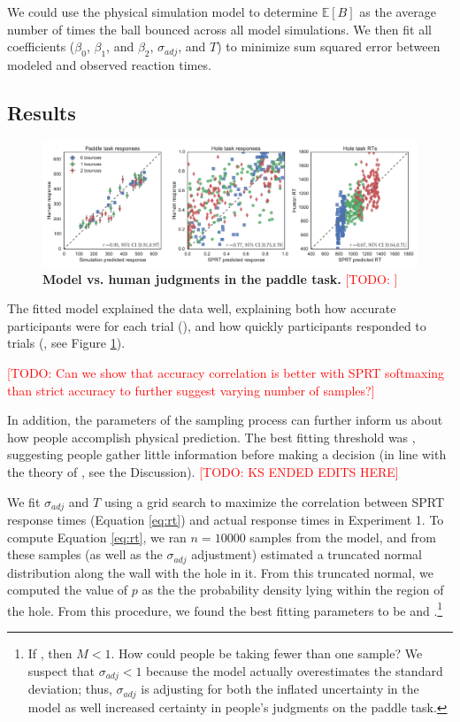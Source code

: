 \documentclass[10pt,letterpaper]{article}
\newcommand{\TODO}[1]{\textcolor{red}{[TODO: #1]}}
\begin{document}
We could use the physical simulation model to determine $\mathbb{E}[B]$ as the average number of times the ball bounced across all model simulations. We then fit all coefficients ($\beta_0$, $\beta_1$, and $\beta_2$, $\sigma_{adj}$, and $T$) to minimize sum squared error between modeled and observed reaction times.

\subsection{Results}

\begin{figure}[t]
    \begin{center}
        \includegraphics[width=\textwidth]{figures/model_results.pdf}
        \caption{\textbf{Model vs. human judgments in the paddle task.} \TODO{}}
        \label{fig:model-results}
    \end{center}
\end{figure}

The fitted model explained the data well, explaining both how accurate participants were for each trial (\HoleResponseCorr{}), and how quickly participants responded to trials (\HoleRTCorr{}, see Figure \ref{fig:model-results}).

\TODO{Can we show that accuracy correlation is better with SPRT softmaxing than strict accuracy to further suggest varying number of samples?}

In addition, the parameters of the sampling process can further inform us about how people accomplish physical prediction. The best fitting threshold was \threshold{}, suggesting people gather little information before making a decision (in line with the theory of \cite{Vul:2014ba}, see the Discussion). \TODO{KS ENDED EDITS HERE}

We fit $\sigma_{adj}$ and $T$ using a grid search to maximize the correlation between SPRT response times (Equation \ref{eq:rt}) and actual response times in Experiment 1. To compute Equation \ref{eq:rt}, we ran $n=10000$ samples from the model, and from these samples (as well as the $\sigma_{adj}$ adjustment) estimated a truncated normal distribution along the wall with the hole in it. From this truncated normal, we computed the value of $p$ as the the probability density lying within the region of the hole. From this procedure, we found the best fitting parameters to be \sdadj{} and \threshold{}.\footnote{If \sdadj{}, then $M<1$. How could people be taking fewer than one sample? We suspect that $\sigma_{adj}<1$ because the model actually overestimates the standard deviation; thus, $\sigma_{adj}$ is adjusting for both the inflated uncertainty in the model as well increased certainty in people's judgments on the paddle task.}
\end{document}
